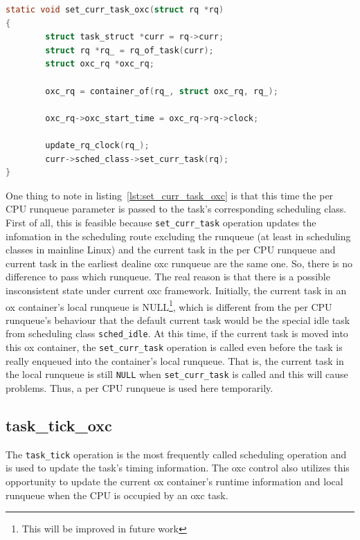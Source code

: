 \begin{lstlisting}[language=C,
	caption={Another point to update reservation information},
	label={lst:set_curr_task_oxc}]
static void set_curr_task_oxc(struct rq *rq)
{
        struct task_struct *curr = rq->curr;
        struct rq *rq_ = rq_of_task(curr);
        struct oxc_rq *oxc_rq;

        oxc_rq = container_of(rq_, struct oxc_rq, rq_);

        oxc_rq->oxc_start_time = oxc_rq->rq->clock;

        update_rq_clock(rq_);
        curr->sched_class->set_curr_task(rq);
}
\end{lstlisting}

One thing to note in listing~\ref{lst:set_curr_task_oxc} is that 
this time the per CPU runqueue parameter is passed to the 
task's corresponding scheduling class. First of all, this is feasible 
because \texttt{set\_curr\_task} operation updates the infomation in the 
scheduling route excluding the runqueue (at least in scheduling classes
in mainline Linux) and the current task in the per CPU runqueue
and current task in the earliest dealine oxc runqueue are the same one. 
So, there is no difference to pass which runqueue. 
The real reason is that there is a possible insconsistent state under 
current oxc framework. Initially, the current task in an ox 
container's local runqueue is 
NULL\footnote{This will be improved in future work}, which is different
from the per CPU runqueue's behaviour that the default current task would 
be the special idle task from scheduling class \texttt{sched\_idle}. 
At this time, if the current task is moved 
into this ox container, the \texttt{set\_curr\_task} operation is called 
even before the task is really enqueued into the container's local runqueue. 
That is, the current task in the local runqueue is still \texttt{NULL} when
\texttt{set\_curr\_task} is called and this will cause problems. Thus, a 
per CPU runqueue is used here temporarily.

\subsection{task\_tick\_oxc\label{sec:task_tick_oxc}}

The \texttt{task\_tick} operation is the most frequently called 
scheduling operation and is used to update the task's timing 
information. 
The oxc control also utilizes this opportunity to update the 
current ox container's runtime information and 
local runqueue when the CPU is occupied by an oxc task.

